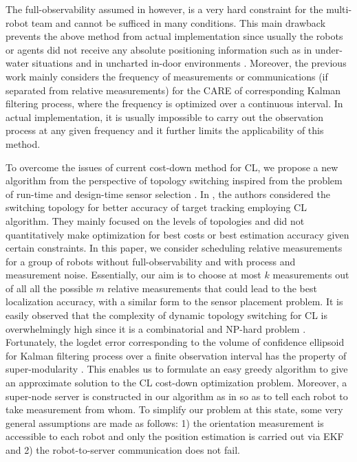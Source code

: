 \documentclass[conference]{IEEEtran}
\begin{document}
The full-observability assumed in \cite{mourikis2006optimal,chang2018optimal} however, is a very hard constraint for the multi-robot team and cannot be sufficed in many conditions.
This main drawback prevents the above method from actual implementation since usually the robots or agents did not receive any absolute positioning information such as in under-water situations \cite{bahr2009cooperative} and in uncharted in-door environments \cite{hausman2015cooperative,zhu2018loosely}.
Moreover, the previous work \cite{mourikis2006optimal,chang2018optimal} mainly considers the frequency of measurements or communications (if separated from relative measurements) for the CARE of corresponding Kalman filtering process, where the frequency is optimized over a continuous interval.
In actual implementation, it is usually impossible to carry out the observation process at any given frequency and it further limits the applicability of this method.

To overcome the issues of current cost-down method for CL, we propose a new algorithm from the perspective of topology switching inspired from the problem of run-time and design-time sensor selection \cite{vitus2012efficient,jawaid2015submodularity,tzoumas2016nearoptimal,tzoumas2016sensor,tzoumas2017scheduling,tzoumas2018selecting,zhang2017sensor,hausman2015cooperative}.
In \cite{hausman2015cooperative}, the authors considered the switching topology for better accuracy of	target tracking employing CL algorithm.
They mainly focused on the levels of topologies and did not quantitatively make optimization for best costs or best estimation accuracy given certain constraints.
In this paper, we consider scheduling relative measurements for a group of robots without full-observability and with process and measurement noise.
Essentially, our aim is to choose at most $k$ measurements out of all  all the possible $m$ relative measurements that could lead to the best localization accuracy, with a similar form to the sensor placement problem.
It is easily observed that the complexity of dynamic topology switching for CL is overwhelmingly high since it is a combinatorial and NP-hard problem \cite{zhang2017sensor}.
Fortunately, the logdet error corresponding to the volume of confidence ellipsoid for Kalman filtering process over a finite observation interval has the property of super-modularity \cite{tzoumas2016sensor}.
This enables us to formulate an easy greedy algorithm to give an approximate solution to the CL cost-down optimization problem. 
Moreover, a super-node server is constructed in our algorithm as in \cite{kia2018serverassisted} so as to tell each robot to take measurement from whom.
To simplify our problem at this state, some very general assumptions are made as follows: 1) the orientation measurement is accessible to each robot and only the position estimation is carried out via EKF and 2) the robot-to-server communication does not fail.
\end{document}
